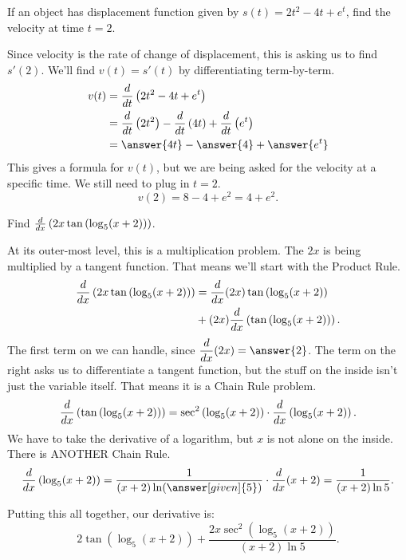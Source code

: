 \documentclass{ximera}
\begin{document}
\begin{example}
	If an object has displacement function given by $s(t) = 2t^2 - 4t + e^t$, find the velocity at time $t = 2$.
	\begin{explanation}
		Since velocity is the rate of change of displacement, this is asking us to find $s'(2)$.  We'll find
		$v(t) = s'(t)$ by differentiating term-by-term.
		\begin{align*}
			v(t) 	&= \ddt\left(2t^2-4t+e^t \right)\\
				&= \ddt\left(2t^2\right) - \ddt\left(4t\right) + \ddt \left( e^t \right)\\
				&= \answer{4t} - \answer{4} + \answer{e^t}
		\end{align*}
		This gives a formula for $v(t)$, but we are being asked for the velocity at a specific time.  We still need to
		plug in $t = 2$.
		\[ v(2) = 8 - 4 + e^2 = 4+ e^2. \]
	\end{explanation}
\end{example}

\begin{example}
	Find $\frac{d}{\mathop{}\!d x} \left( 2x \tan \left(\log_5 (x+2)\right) \right)$.
	\begin{explanation}
		At its outer-most level, this is a multiplication problem.  The $2x$ is being multiplied by a tangent function.  That means we'll start with
		the Product Rule.
		\begin{align*} 
		\frac{d}{\mathop{}\!d x} \left( 2x \tan\left( \log_5 (x+2) \right) \right) &= \frac{d}{\mathop{}\!d x}(2x) \tan\left( \log_5 (x+2) \right) \\
			&+ (2x) \frac{d}{\mathop{}\!d x}\left( \tan\left( \log_5 (x+2)\right) \right).
		\end{align*}
		The first term on we can handle, since $\displaystyle \ddx(2x) = \answer{2}$.  The term on the right asks us to differentiate a tangent function, but the stuff
		on the inside isn't just the variable itself.  That means it is a Chain Rule problem.
			\[ \frac{d}{\mathop{}\!d x} \left( \tan \left( \log_5 (x+2) \right) \right) = \sec^2\left( \log_5 (x+2) \right) \cdot \frac{d}{\mathop{}\!d x} \left( \log_5 (x+2) \right). \]
		We have to take the derivative of a logarithm, but $x$ is not alone on the inside.  There is ANOTHER Chain Rule.
			\[ \ddx \left( \log_5 (x+2) \right) = \dfrac{1}{(x+2) \ln( \answer[given]{5} )} \cdot \ddx(x+2) = \dfrac{1}{(x+2) \ln 5}. \]

		Putting this all together, our derivative is:
		\[ 2 \tan \left( \log_5 (x+2) \right) + \dfrac{2x \sec^2 \left( \log_5 (x+2) \right)}{(x+2) \ln 5}. \]
	\end{explanation}
\end{example}
\end{document}
